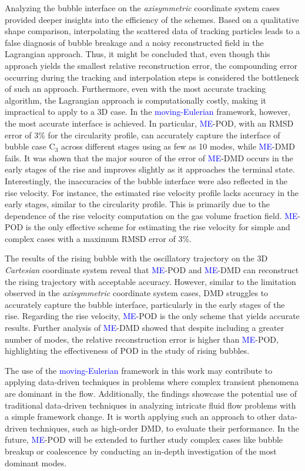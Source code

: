 \documentclass[a4paper,fleqn]{cas-sc}
\newcommand{\hl}[1]{\textcolor{blue}{#1}}
\newcommand{\hl}[1]{#1}
\begin{document}
	Analyzing the bubble interface on the \textit{axisymmetric} coordinate system cases provided deeper insights into the efficiency of the schemes. Based on a qualitative shape comparison, interpolating the scattered data of tracking particles leads to a false diagnosis of bubble breakage and a noisy reconstructed field in the Lagrangian approach. Thus, it might be concluded that, even though this approach yields the smallest relative reconstruction error, the compounding error occurring during the tracking and interpolation steps is considered the bottleneck of such an approach. Furthermore, even with the most accurate tracking algorithm, the Lagrangian approach is computationally costly, making it impractical to apply to a 3D case. In the \hl{moving-Eulerian} framework, however, the most accurate interface is achieved. In particular, \hl{ME}-POD, with an RMSD error of 3\% for the circularity profile, can accurately capture the interface of bubble case C$_3$ across different stages using as few as 10 modes, while \hl{ME}-DMD fails. It was shown that the major source of the error of \hl{ME}-DMD occurs in the early stages of the rise and improves slightly as it approaches the terminal state. Interestingly, the inaccuracies of the bubble interface were also reflected in the rise velocity. For instance, the estimated rise velocity profile lacks accuracy in the early stages, similar to the circularity profile. This is primarily due to the dependence of the rise velocity computation on the gas volume fraction field. \hl{ME}-POD is the only effective scheme for estimating the rise velocity for simple and complex cases with a maximum RMSD error of 3\%.
	
	The results of the rising bubble with the oscillatory trajectory on the 3D \textit{Cartesian} coordinate system reveal that \hl{ME}-POD and \hl{ME}-DMD can reconstruct the rising trajectory with acceptable accuracy. However, similar to the limitation observed in the \textit{axisymmetric} coordinate system cases, DMD struggles to accurately capture the bubble interface, particularly in the early stages of the rise. Regarding the rise velocity, \hl{ME}-POD is the only scheme that yields accurate results. Further analysis of \hl{ME}-DMD showed that despite including a greater number of modes, the relative reconstruction error is higher than \hl{ME}-POD, highlighting the effectiveness of POD in the study of rising bubbles.
	
	The use of the \hl{moving-Eulerian} framework in this work may contribute to applying data-driven techniques in problems where complex transient phenomena are dominant in the flow. Additionally, the findings showcase the potential use of traditional data-driven techniques in analyzing intricate fluid flow problems with a simple framework change. It is worth applying such an approach to other data-driven techniques, such as high-order DMD, to evaluate their performance.  In the future, \hl{ME}-POD will be extended to further study complex cases like bubble breakup or coalescence by conducting an in-depth investigation of the most dominant modes. \\
	
\end{document}
